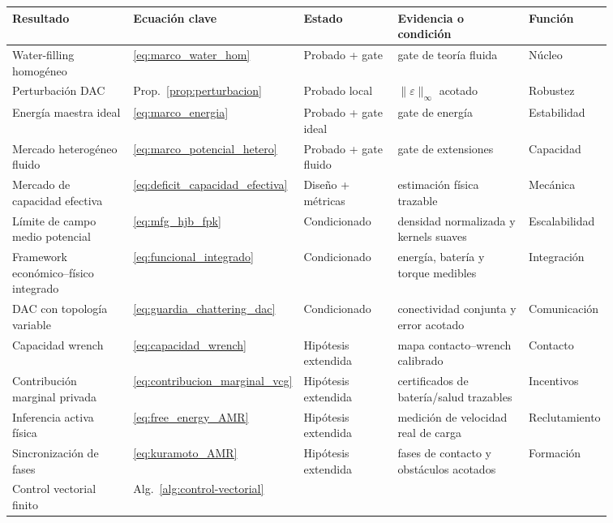 \begingroup
\footnotesize
\renewcommand{\arraystretch}{1.12}
\setlength{\tabcolsep}{2.5pt}
\begin{longtable}{@{}>{\raggedright\arraybackslash}p{0.21\linewidth}>{\raggedright\arraybackslash}p{0.13\linewidth}>{\raggedright\arraybackslash}p{0.16\linewidth}>{\raggedright\arraybackslash}p{0.23\linewidth}>{\raggedright\arraybackslash}p{0.13\linewidth}@{}}
\toprule
\textbf{Resultado} & \textbf{Ecuación clave} & \textbf{Estado} & \textbf{Evidencia o condición} & \textbf{Función} \\
\midrule
Water-filling homogéneo & \eqref{eq:marco_water_hom} & Probado + gate &
gate de teoría fluida & Núcleo \\
Perturbación DAC & Prop.~\ref{prop:perturbacion} & Probado local &
\(\|\varepsilon\|_\infty\) acotado & Robustez \\
Energía maestra ideal & \eqref{eq:marco_energia} & Probado + gate ideal &
gate de energía & Estabilidad \\
Mercado heterogéneo fluido & \eqref{eq:marco_potencial_hetero} & Probado + gate fluido &
gate de extensiones & Capacidad \\
Mercado de capacidad efectiva & \eqref{eq:deficit_capacidad_efectiva} &
Diseño + métricas & estimación física trazable & Mecánica \\
Límite de campo medio potencial & \eqref{eq:mfg_hjb_fpk} & Condicionado &
densidad normalizada y kernels suaves & Escalabilidad \\
Framework económico--físico integrado & \eqref{eq:funcional_integrado} &
Condicionado & energía, batería y torque medibles & Integración \\
DAC con topología variable & \eqref{eq:guardia_chattering_dac} &
Condicionado & conectividad conjunta y error acotado & Comunicación \\
Capacidad wrench & \eqref{eq:capacidad_wrench} &
Hipótesis extendida & mapa contacto--wrench calibrado & Contacto \\
Contribución marginal privada & \eqref{eq:contribucion_marginal_vcg} &
Hipótesis extendida & certificados de batería/salud trazables & Incentivos \\
Inferencia activa física & \eqref{eq:free_energy_AMR} &
Hipótesis extendida & medición de velocidad real de carga & Reclutamiento \\
Sincronización de fases & \eqref{eq:kuramoto_AMR} &
Hipótesis extendida & fases de contacto y obstáculos acotados & Formación \\
Control vectorial finito & Alg.~\ref{alg:control-vectorial} &

\end{longtable}

